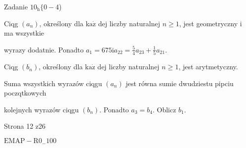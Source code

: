 \documentclass[a4paper,12pt]{article}
\begin{document}
Zadanie $10_{\mathrm{h}}\{0-4$)

Ciqg $(a_{n})$, określony dla $\mathrm{k}\mathrm{a}\dot{\mathrm{z}}$ dej liczby naturalnej $n\geq 1$, jest geometryczny i ma wszystkie

wyrazy dodatnie. Ponadto $a_{1}=675 \mathrm{i} a_{22}=\displaystyle \frac{5}{4}a_{23}+\frac{1}{5}a_{21}.$

Ciqg $(b_{n})$, określony dla $\mathrm{k}\mathrm{a}\dot{\mathrm{z}}$ dej liczby naturalnej $n\geq 1$, jest arytmetyczny.

Suma wszystkich wyrazów ciqgu $(a_{n})$ jest równa sumie dwudziestu pipciu poczqtkowych

kolejnych wyrazów ciqgu $(b_{n})$. Ponadto $a_{3}=b_{4}$. Oblicz $b_{1}.$

Strona 12 z26

$\mathrm{E}\mathrm{M}\mathrm{A}\mathrm{P}-\mathrm{R}0_{-}100$
\end{document}
